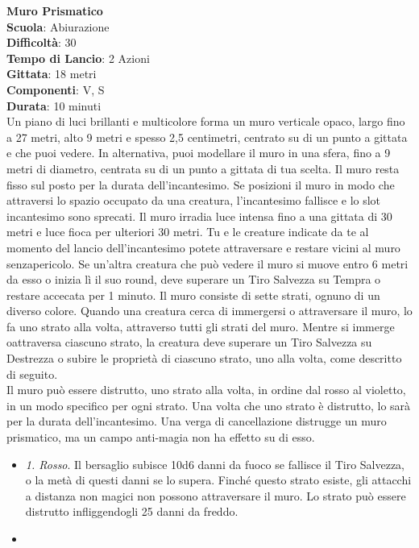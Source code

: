 \begin{multicols}{2}
\medskip\textbf{Muro Prismatico}\\
\textbf{Scuola}: Abiurazione\\
\textbf{Difficoltà}:  30\\
\textbf{Tempo di Lancio}: 2 Azioni\\
\textbf{Gittata}: 18 metri\\
\textbf{Componenti}: V, S\\
\textbf{Durata}: 10 minuti\\
Un piano di luci brillanti e multicolore forma un muro verticale opaco, largo fino a 27 metri, alto 9 metri e spesso 2,5 centimetri, centrato su di un punto a gittata e che puoi vedere. In alternativa, puoi modellare il muro in una sfera, fino a 9 metri di diametro, centrata su di un punto a gittata di tua scelta. Il muro resta fisso sul posto per la durata dell'incantesimo. Se posizioni il muro in modo che attraversi lo spazio occupato da una creatura, l'incantesimo fallisce e lo slot incantesimo sono sprecati. Il muro irradia luce intensa fino a una gittata di 30 metri e luce fioca per ulteriori 30 metri. Tu e le creature indicate da te al momento del lancio dell'incantesimo potete attraversare e restare vicini al muro senzapericolo. Se un'altra  creatura che può vedere il muro si muove entro 6 metri da esso o inizia lì il suo round, deve superare un Tiro Salvezza su Tempra o restare accecata per 1 minuto. Il muro consiste di sette strati, ognuno di un diverso colore. Quando una creatura cerca di immergersi o attraversare il muro, lo fa uno strato alla volta, attraverso tutti gli strati del muro. Mentre si immerge oattraversa  ciascuno strato, la creatura deve superare un Tiro Salvezza su Destrezza o subire le proprietà di ciascuno strato, uno alla volta, come descritto di seguito.\\
Il muro può essere distrutto, uno strato alla volta, in ordine dal rosso al violetto, in un modo specifico per ogni strato. Una volta che uno strato è distrutto, lo sarà per la durata dell'incantesimo. Una verga di cancellazione distrugge un muro prismatico, ma un campo anti-magia non ha effetto su di esso.
\medskip
\begin{itemize}
\item
\textit{1. Rosso}. Il bersaglio subisce 10d6 danni da fuoco se fallisce il Tiro Salvezza, o la metà di questi danni se lo supera. Finché questo strato esiste, gli attacchi a distanza non magici non possono attraversare il muro.  Lo strato può essere distrutto infliggendogli 25 danni da freddo.
\item

\end{itemize}
\end{multicols}
